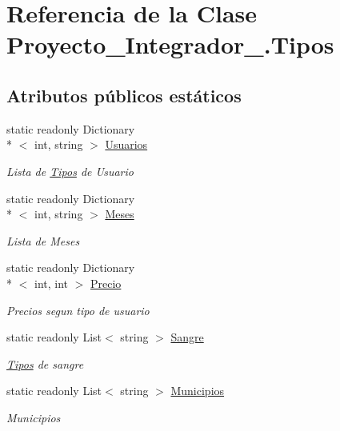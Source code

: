 \hypertarget{class_proyecto___integrador__3_1_1_tipos}{\section{Referencia de la Clase Proyecto\-\_\-\-Integrador\-\_.\-Tipos}
\label{class_proyecto___integrador__3_1_1_tipos}
}
\subsection*{Atributos públicos estáticos}
\begin{DoxyCompactItemize}
\item 
static readonly Dictionary\\*
$<$ int, string $>$ \hyperlink{class_proyecto___integrador__3_1_1_tipos_ae053b8caca38c487e2d9d2635b154c88}{Usuarios}
\begin{DoxyCompactList}\small\item\em Lista de \hyperlink{class_proyecto___integrador__3_1_1_tipos}{Tipos} de Usuario \end{DoxyCompactList}\item 
static readonly Dictionary\\*
$<$ int, string $>$ \hyperlink{class_proyecto___integrador__3_1_1_tipos_a5c5105231581a49b0914b197f4aed005}{Meses}
\begin{DoxyCompactList}\small\item\em Lista de Meses \end{DoxyCompactList}\item 
static readonly Dictionary\\*
$<$ int, int $>$ \hyperlink{class_proyecto___integrador__3_1_1_tipos_afe593c0c3c57dd7bf5133d57974f1ed3}{Precio}
\begin{DoxyCompactList}\small\item\em Precios segun tipo de usuario \end{DoxyCompactList}\item 
static readonly List$<$ string $>$ \hyperlink{class_proyecto___integrador__3_1_1_tipos_a25b8a490a180214246eedb322ed962a2}{Sangre}
\begin{DoxyCompactList}\small\item\em \hyperlink{class_proyecto___integrador__3_1_1_tipos}{Tipos} de sangre \end{DoxyCompactList}\item 
static readonly List$<$ string $>$ \hyperlink{class_proyecto___integrador__3_1_1_tipos_a950165b224eba3af8ee67d0b344f0704}{Municipios}
\begin{DoxyCompactList}\small\item\em Municipios \end{DoxyCompactList}\end{DoxyCompactItemize}
